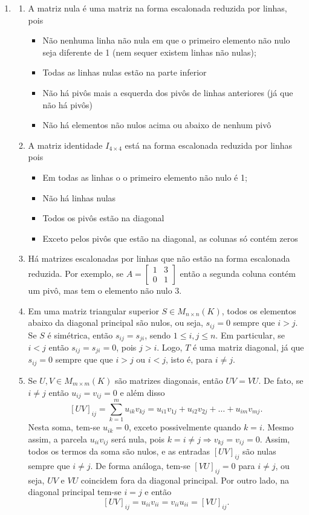 \documentclass[12pt,a4paper]{article}
\begin{document}
\begin{enumerate}
\item
\begin{enumerate}
\item A matriz nula é uma matriz na forma escalonada reduzida por linhas, pois 
\begin{itemize}
\item Não nenhuma linha não nula em que o primeiro elemento não nulo seja diferente de 1 (nem sequer existem linhas não nulas);
\item Todas as linhas nulas estão na parte inferior
\item Não há pivôs mais a esquerda dos pivôs de linhas anteriores (já que não há pivôs)
\item Não há elementos não nulos acima ou abaixo de nenhum pivô
\end{itemize}
\item A matriz identidade $I_{4 \times 4}$ está na forma escalonada reduzida por linhas pois
\begin{itemize}
\item Em todas as linhas o o primeiro elemento não nulo é 1;
\item Não há linhas nulas
\item Todos os pivôs estão na diagonal
\item Exceto pelos pivôs que estão na diagonal, as colunas só contém zeros
\end{itemize}
\item Há matrizes escalonadas por linhas que não estão na forma escalonada reduzida. Por exemplo, se $A = \begin{bmatrix}
1 & 3 \\ 0 & 1
\end{bmatrix}$ então a segunda coluna contém um pivô, mas tem o elemento não nulo 3.
\item Em uma matriz triangular superior $S \in M_{n \times n}(K)$, todos os elementos abaixo da diagonal principal são nulos, ou seja, $s_{ij} = 0$ sempre que $i > j$. Se $S$ é simétrica, então $s_{ij} = s_{ji}$, sendo $1 \leq i,j \leq n$. Em particular, se $i < j$ então $s_{ij} = s_{ji} = 0$, pois $j > i$. Logo, $T$ é uma matriz diagonal, já que $s_{ij} = 0$ sempre que que $i > j$ ou $i < j$, isto é, para $i \neq j$.

\item Se $U, V \in M_{m \times m} (K)$ são matrizes diagonais, então $UV = VU$. De fato, se $i \neq j$ então $u_{ij} = v_{ij} = 0$ e além disso
\[
\left[UV\right]_{ij}
= \sum_{k=1}^m u_{ik} v_{kj}
= u_{i1} v_{1j} + u_{i2} v_{2j} + \ldots + u_{im} v_{mj}.
\]
Nesta soma, tem-se $u_{ik} = 0$, exceto possivelmente quando $k = i$. Mesmo assim, a parcela $u_{ii}v_{ij}$ será nula, pois $k = i \neq j \Rightarrow v_{kj} = v_{ij} = 0$. Assim, todos os termos da soma são nulos, e as entradas $\left[UV\right]_{ij}$ são nulas sempre que $i \neq j$. De forma análoga, tem-se $\left[VU\right]_{ij} = 0 $ para $i \neq j$, ou seja, $UV$ e $VU$ coincidem fora da diagonal principal. Por outro lado, na diagonal principal tem-se $i = j$ e então
\[
\left[UV\right]_{ij} = u_{ii} v_{ii} = v_{ii} u_{ii} = \left[VU\right]_{ij}.
\]


\end{enumerate}
\end{enumerate}
\end{document}
